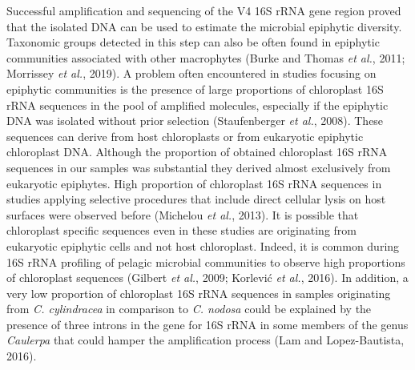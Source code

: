 \documentclass[
  12pt,
]{article}
\begin{document}
Successful amplification and sequencing of the V4 16S rRNA gene region
proved that the isolated DNA can be used to estimate the microbial
epiphytic diversity. Taxonomic groups detected in this step can also be
often found in epiphytic communities associated with other macrophytes
(Burke and Thomas \emph{et al.}, 2011; Morrissey \emph{et al.}, 2019). A
problem often encountered in studies focusing on epiphytic communities
is the presence of large proportions of chloroplast 16S rRNA sequences
in the pool of amplified molecules, especially if the epiphytic DNA was
isolated without prior selection (Staufenberger \emph{et al.}, 2008).
These sequences can derive from host chloroplasts or from eukaryotic
epiphytic chloroplast DNA. Although the proportion of obtained
chloroplast 16S rRNA sequences in our samples was substantial they
derived almost exclusively from eukaryotic epiphytes. High proportion of
chloroplast 16S rRNA sequences in studies applying selective procedures
that include direct cellular lysis on host surfaces were observed before
(Michelou \emph{et al.}, 2013). It is possible that chloroplast specific
sequences even in these studies are originating from eukaryotic
epiphytic cells and not host chloroplast. Indeed, it is common during
16S rRNA profiling of pelagic microbial communities to observe high
proportions of chloroplast sequences (Gilbert \emph{et al.}, 2009;
Korlević \emph{et al.}, 2016). In addition, a very low proportion of
chloroplast 16S rRNA sequences in samples originating from \emph{C.
cylindracea} in comparison to \emph{C. nodosa} could be explained by the
presence of three introns in the gene for 16S rRNA in some members of
the genus \emph{Caulerpa} that could hamper the amplification process
(Lam and Lopez-Bautista, 2016).
\end{document}
